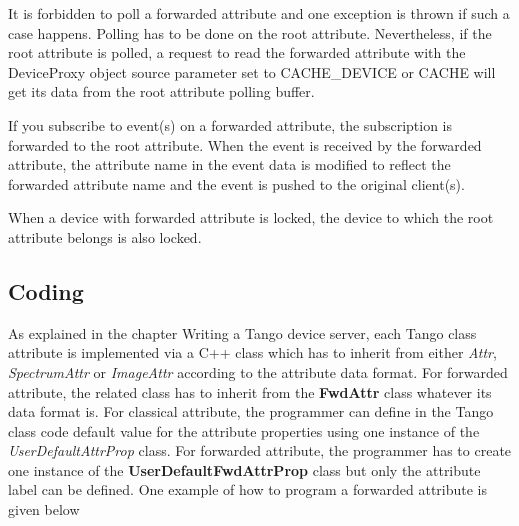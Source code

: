 It is forbidden to poll a forwarded attribute and one exception is
thrown if such a case happens. Polling has to be done on the root
attribute. Nevertheless, if the root attribute is polled, a request
to read the forwarded attribute with the DeviceProxy object source
parameter set to CACHE\_DEVICE or CACHE will get its data from the
root attribute polling buffer.

If you subscribe to event(s) on a forwarded attribute, the subscription
is forwarded to the root attribute. When the event is received by
the forwarded attribute, the attribute name in the event data is modified
to reflect the forwarded attribute name and the event is pushed to
the original client(s).

When a device with forwarded attribute is locked, the device to which
the root attribute belongs is also locked.


\subsection{Coding}

As explained in the chapter \textquotedbl{}Writing a Tango device
server\textquotedbl{}, each Tango class attribute is implemented via
a C++ class which has to inherit from either \emph{Attr}, \emph{SpectrumAttr}
or \emph{ImageAttr} according to the attribute data format. For forwarded
attribute, the related class has to inherit from the \textbf{FwdAttr}
class whatever its data format is. For classical attribute, the programmer
can define in the Tango class code default value for the attribute
properties using one instance of the \emph{UserDefaultAttrProp} class.
For forwarded attribute, the programmer has to create one instance
of the \textbf{UserDefaultFwdAttrProp}
class but only the attribute label can be defined. One example of
how to program a forwarded attribute is given below

